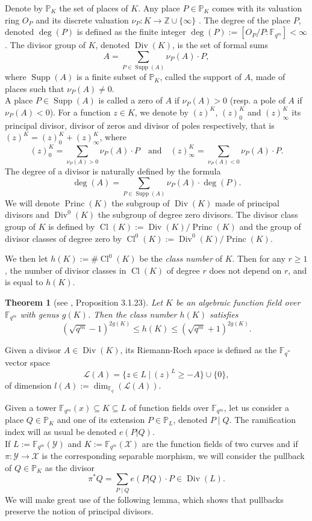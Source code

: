 \documentclass[10pt]{article}
\newtheorem{thm}{Theorem}
\newcommand{\s}{\vspace{0.3cm}}
\newcommand{\cd}{\cdot}
\newcommand{\Z}{\mathbb{Z}}
\newcommand{\PP}{\mathbb{P}}
\newcommand{\fqm}{\mathbb{F}_{q^m}}
\newcommand{\fq}{\mathbb{F}_q}
\newcommand{\su}{\subseteq}
\newcommand{\X}{\mathcal{X}}
\newcommand{\Y}{\mathcal{Y}}
\newcommand{\Div}{\operatorname{Div}}
\newcommand{\Princ}{\operatorname{Princ}}
\newcommand{\Cl}{\operatorname{Cl}}
\newcommand{\Supp}{\operatorname{Supp}}
\begin{document}
Denote by $\PP_K$ the set of places of $K$. Any place $P \in \PP_K$ comes with its valuation ring $O_P$ and its discrete valuation $\nu_P : K \rightarrow \Z \cup \{\infty\}$ . The degree of the place $P$, denoted $\deg( P)$ is defined as the finite integer $\deg(  P) :=  [O_P/P:\fqm] < \infty$.
The divisor group of $K$, denoted $\Div(K)$, is the set of formal sums 
\[A = \sum\limits_{P \in \Supp(A)} \nu_P(A) \cd P,\]
where $\Supp(A)$ is a finite subset of $\PP_K$, called the support of $A$, made of places such that $\nu_{P}(A) \neq 0$. \\ A place  $P \in \Supp(A)$ is called a zero of $A$ if $\nu_P(A) >0$ (resp. a pole of $A$ if $\nu_P(A) < 0$). For a function $z \in K$, we denote by $(z)^K$, $(z)^K_0$ and $(z)^K_{\infty}$ its principal divisor, divisor of zeros and divisor of poles respectively, that is $(z)^K = (z)^K_0 + (z)^K_{\infty}$, where 
\[(z)^K_0 = \sum\limits_{\nu_P(A) > 0}\nu_P(A) \cd P \quad \textrm{and}  \quad (z)^K_{\infty} = \sum\limits_{\nu_P(A) < 0}\nu_P(A) \cd P.\]
The degree of a divisor is naturally defined by the formula
\[\deg ( A) = \sum\limits_{P \in \Supp(A)} \nu_P(A) \cd \deg( P).\]
\s
We will denote $\Princ(K)$ the subgroup of $\Div(K)$ made of principal divisors and $\Div^0(K)$ the subgroup of degree zero divisors. The divisor class group of $K$ is defined by $\Cl(K):=\Div(K)/\Princ(K)$ and the group of divisor classes of degree zero by $\Cl^0(K):=\Div^0(K)/\Princ(K)$. 

We then let $h(K) := \# \Cl^0(K)$ be the \emph{class number} of $K$. Then for any $r \geq 1$, the number of divisor classes in $\Cl(K)$ of degree $r$ does not depend on $r$, and is equal to $h(K)$.

\s

\begin{thm}[see \cite{Tsf}, Proposition 3.1.23]\label{esti h(X)}
Let $K$ be an algebraic function field over $\fqm$ with genus $g(K)$. Then the class number $h(K)$ satisfies
\[ (\sqrt{q^m}-1)^{2g(K)} \leq h(K) \leq (\sqrt{q^m}+1)^{2g(K)}.\]
\end{thm}
\s

Given a divisor $A \in \Div(K)$, its Riemann-Roch space is defined as the $\fq$-vector space
\[\mathcal{L}(A) = \{z \in L \ | \ (z)^L \geq -A\} \cup \{0\},\]
of dimension $l(A):= \dim_{\fq}(\mathcal{L}(A))$.

\s

Given a tower $\fqm(x) \su K \su L$ of function fields over $\fqm$, let us consider a place  $Q \in \PP_K$ and one of its extension $P \in \PP_L$, denoted $P\mid Q$. The ramification index will as usual be denoted $e(P|Q)$. \\
If $L := \fqm(\Y)$ and $K:=\fqm(\X)$ are the function fields of two curves and if $\pi : \Y \rightarrow \X$ is the corresponding separable morphism, we will consider the pullback of $Q \in \PP_K$ as the divisor
\[\pi^*Q = \sum\limits_{P \mid Q} e(P|Q) \cd P \in \Div(L).\]
We will make great use of the following lemma, which shows that pullbacks preserve the notion of principal divisors.
\end{document}
